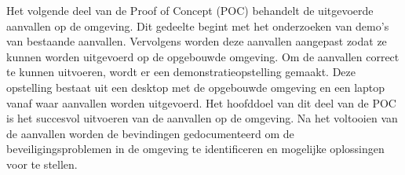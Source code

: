 Het volgende deel van de Proof of Concept (POC) behandelt de uitgevoerde aanvallen op de omgeving. Dit gedeelte begint met het onderzoeken van demo's van bestaande aanvallen. Vervolgens worden deze aanvallen aangepast zodat ze kunnen worden uitgevoerd op de opgebouwde omgeving. Om de aanvallen correct te kunnen uitvoeren, wordt er een demonstratieopstelling gemaakt. Deze opstelling bestaat uit een desktop met de opgebouwde omgeving en een laptop vanaf waar aanvallen worden uitgevoerd. Het hoofddoel van dit deel van de POC is het succesvol uitvoeren van de aanvallen op de omgeving. Na het voltooien van de aanvallen worden de bevindingen gedocumenteerd om de beveiligingsproblemen in de omgeving te identificeren en mogelijke oplossingen voor te stellen.



